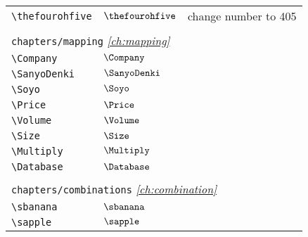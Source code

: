 \begin{longtable}{lll}
  {\color[rgb]{0.5,0.5,0.5}\texttt{\textbackslash thefourohfive}}                                           & $\thefourohfive$
  & change number to 405
  \\
  &                            &                                                         \\
  \multicolumn{3}{l}{{\color[rgb]{0.5,0.5,0.5}\texttt{chapters/mapping}} \emph{\cref{ch:mapping}}}
  \\
  \hline
  {\color[rgb]{0.5,0.5,0.5}\texttt{\textbackslash Company}}                                                 & $\Company$                 & \\
  {\color[rgb]{0.5,0.5,0.5}\texttt{\textbackslash SanyoDenki}}                                              & $\SanyoDenki$              & \\
  {\color[rgb]{0.5,0.5,0.5}\texttt{\textbackslash Soyo}}                                                    & $\Soyo$                    & \\
  {\color[rgb]{0.5,0.5,0.5}\texttt{\textbackslash Price}}                                                   & $\Price$                   & \\
  {\color[rgb]{0.5,0.5,0.5}\texttt{\textbackslash Volume}}                                                  & $\Volume$                  & \\
  {\color[rgb]{0.5,0.5,0.5}\texttt{\textbackslash Size}}                                                    & $\Size$                    & \\
  {\color[rgb]{0.5,0.5,0.5}\texttt{\textbackslash Multiply}}                                                & $\Multiply$                & \\
  {\color[rgb]{0.5,0.5,0.5}\texttt{\textbackslash Database}}                                                & $\Database$                &                                                         \\
  &                            &                                                         \\
  \multicolumn{3}{l}{{\color[rgb]{0.5,0.5,0.5}\texttt{chapters/combinations}} \emph{\cref{ch:combination}}}
  \\
  \hline
  {\color[rgb]{0.5,0.5,0.5}\texttt{\textbackslash sbanana}}                                                 & $\sbanana$                 & \\
  {\color[rgb]{0.5,0.5,0.5}\texttt{\textbackslash sapple}}                                                  & $\sapple$                  & \\

\end{longtable}
